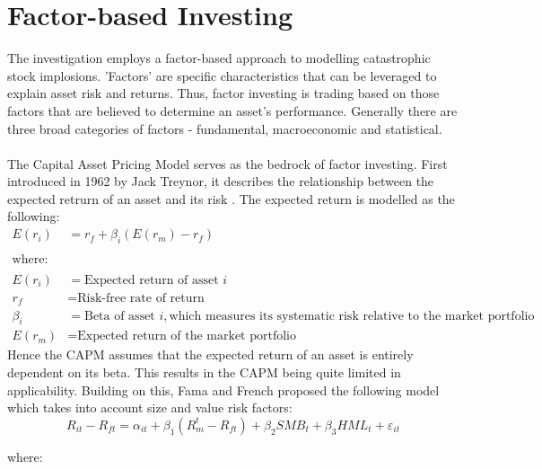 \documentclass[a4paper]{report}
\begin{document}
\section{Factor-based Investing}

The investigation employs a factor-based approach to modelling catastrophic stock implosions. 'Factors' are specific characteristics that can be leveraged to explain 
asset risk and returns. Thus, factor investing is trading based on those factors that are believed to determine an asset's performance. Generally there are three broad categories of factors - fundamental, macroeconomic and 
statistical.\\\\The Capital Asset Pricing Model serves as the bedrock of factor investing. First introduced in 1962 by Jack Treynor, it describes the relationship between the expected retrurn of an asset and its risk \citep{treynor1961toward}.
The expected return is modelled as the following:
\begin{align*}
  E(r_i) &= r_f + \beta_i (E(r_m) - r_f) \\
  \\
  \text{where:} \\
  \\
  E(r_i) &= \text{Expected return of asset } i \\
  r_f &= \text{Risk-free rate of return} \\
  \beta_i &= \text{Beta of asset } i, \text{which measures its systematic risk relative to the market portfolio} \\
  E(r_m) &= \text{Expected return of the market portfolio}
\end{align*}
Hence the CAPM assumes that the expected return of an asset is entirely dependent on its beta. This results in the CAPM being quite limited in applicability. Building on this, Fama and French \citep{fama1992cross} proposed 
the following model which takes into account size and value risk factors: 
\begin{equation}
  R_{it} - R_{ft} = \alpha_{it} + \beta_1 (R_m^t - R_{ft}) + \beta_2 SMB_t + \beta_3 HML_t + \varepsilon_{it}
  \end{equation}
  
  where:
  
\end{document}
